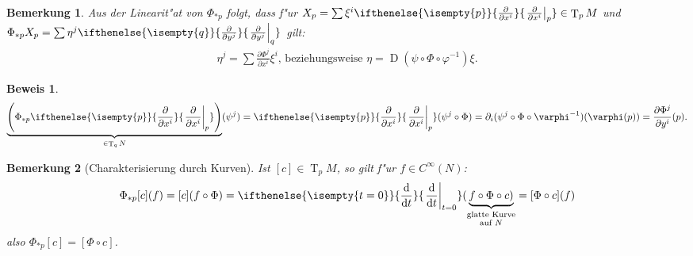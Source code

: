 \documentclass[paper=A4, twoside, chapterprefix=true, bibliography=totoc, headsepline]{scrbook}
\let\temp\phi{}
\let\phi\varphi{}
\let\varphi\temp{}
\let\temp\theta{}
\let\theta\vartheta{}
\let\vartheta\temp{}
\let\temp\epsilon{}
\let\epsilon\varepsilon{}
\let\varepsilon\temp{}
\let\temp\rho{}
\let\rho\varrho{}
\let\varrho\temp{}
\DeclareMathOperator{\D}{D}         %
\DeclareMathOperator{\T}{T}         %
\newcommand{\dop}{\mathrm{d}}
\newcommand{\difffrac}[3][]{\ifthenelse{\isempty{#1}}{\frac{\dop #2}{\dop #3}}{\left. \frac{\dop #2}{\dop #3} \right|_{#1}}}
\newcommand{\pdifffrac}[3][]{\ifthenelse{\isempty{#1}}{\frac{\partial #2}{\partial #3}}{\left. \frac{\partial #2}{\partial #3} \right|_{#1}}}
\theoremstyle{plain}
\theoremstyle{nonumberplain}
\newtheorem{bem}{Bemerkung}
\newtheorem{bew}{Beweis}
\theoremstyle{empty}
\theoremstyle{break}
\begin{document}
\begin{bem}
  Aus der Linearit"at von $\Phi_{*p}$ folgt, dass f"ur $X_p = \sum \xi^i\pdifffrac[p]{}{x^i} \in \T_pM$ und $\Phi_{*p}X_p = \sum \eta^j\pdifffrac[q]{}{y^j}$ gilt:
  \begin{align*}
    \eta^j = \sum \frac{\partial \Phi^j}{\partial x^i}\xi^i \text{, beziehungsweise } \eta = \D(\psi \circ \Phi \circ \phi^{-1})\xi.
  \end{align*}
\end{bem}

\begin{bew}
  \begin{align*}
    \underbrace{\left(\Phi_{*p}\pdifffrac[p]{}{x^i}\right)}_{\in \T_qN}(\psi^j) = \pdifffrac[p]{}{x^i}(\psi^j \circ \Phi) = \partial_i (\psi^j \circ \Phi \circ \phi^{-1})(\phi(p)) = \frac{\partial \Phi^j}{\partial y^i}(p).
  \end{align*}
\end{bew}

\begin{bem}[Charakterisierung durch Kurven]
  Ist $[c] \in \T_p M$, so gilt f"ur $f \in C^{\infty}(N)$:
  \begin{align*}
    \Phi_{*p}[c](f) = [c](f \circ \Phi) = \difffrac[t=0]{}{t}(\underbrace{f \circ \Phi \circ c)}_{\substack{\text{glatte Kurve}\\ \text{auf }N}} = [\Phi \circ c](f)
  \end{align*}
  also $\Phi_{*p}[c] = [\Phi \circ c]$.
\end{bem}
\end{document}
